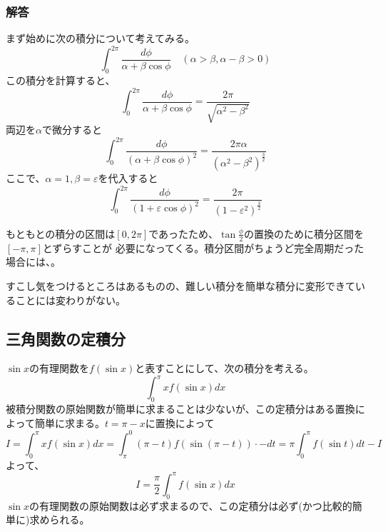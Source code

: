\documentclass[a4j,dvipdfmx]{jsarticle}
\begin{document}
\subsubsection*{解答}
まず始めに次の積分について考えてみる。
\begin{equation*}
    \int_0^{2\pi}\frac{d\phi}{\alpha+\beta\cos\phi}\quad(\alpha>\beta,\alpha-\beta>0)
\end{equation*}
この積分を計算すると、
\begin{equation*}
    \int_0^{2\pi}\frac{d\phi}{\alpha+\beta\cos\phi}=\frac{2\pi}{\sqrt{\alpha^2-\beta^2}}
\end{equation*}
両辺を$\alpha$で微分すると
\begin{equation*}
    \int_{0}^{2\pi}\frac{d\phi}{(\alpha+\beta\cos\phi)^2}=\frac{2\pi\alpha}{(\alpha^2-\beta^2)^{\frac{3}{2}}}
\end{equation*}
ここで、$\alpha=1,\beta=\varepsilon$を代入すると
\begin{equation*}
    \int_0^{2\pi}\frac{d\phi}{(1+\varepsilon\cos\phi)^2}=\frac{2\pi}{(1-\varepsilon^2)^{\frac{3}{2}}}
\end{equation*}

もともとの積分の区間は$[0,2\pi]$であったため、$\tan\frac{\phi}{2}$の置換のために積分区間を$[-\pi,\pi]$とずらすことが
必要になってくる。積分区間がちょうど完全周期だった場合には、。

すこし気をつけるところはあるものの、難しい積分を簡単な積分に変形できていることには変わりがない。
\subsection{三角関数の定積分}
$\sin x$の有理関数を$f(\sin x)$と表すことにして、次の積分を考える。
\begin{equation*}
    \int_0^{\pi} xf(\sin x)dx
\end{equation*}
被積分関数の原始関数が簡単に求まることは少ないが、この定積分はある置換によって簡単に求まる。$t=\pi-x$に置換によって
\begin{equation*}
    I=\int_0^\pi xf(\sin x)dx=\int_\pi^0 (\pi-t)f(\sin(\pi-t))\cdot -dt=\pi\int_0^\pi f(\sin t)dt-I 
\end{equation*}
よって、
\begin{equation*}
    I=\frac{\pi}{2}\int_0^\pi f(\sin x)dx
\end{equation*}
$\sin x$の有理関数の原始関数は必ず求まるので、この定積分は必ず(かつ比較的簡単に)求められる。\\
\end{document}
